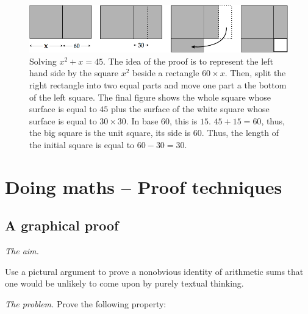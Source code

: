 {}

\begin{figure}[htb]
\begin{center}
       \includegraphics[scale=0.4]{FiguresArithmetic/tabletteMesopotamie}
\caption{Solving $x^2 + x = 45$.
The idea of the proof is to represent the left hand side by the square $x^2$ beside a rectangle $60 \times x$.
Then, split the right rectangle into two equal parts and move one part a the bottom of the left square.
The final figure shows the whole square whose surface is equal to $45$ plus the surface of the white square
whose surface is equal to $30 \times 30$.
In base $60$, this is $15$. 
$45+15 = 60$, thus, the big square is the unit square, its side is $60$.
Thus, the length of the initial square is equal to $60-30=30$.}
\label{fig:equationBabillon}
\end{center}
\end{figure}





\section{Doing maths -- Proof techniques}

\subsection{A graphical proof}

\noindent \textit{The aim.}

Use a pictural argument to prove a nonobvious identity of arithmetic sums
that one would be unlikely to come upon by purely textual thinking.
\medskip

\noindent \textit{The problem.}
Prove the following property:

